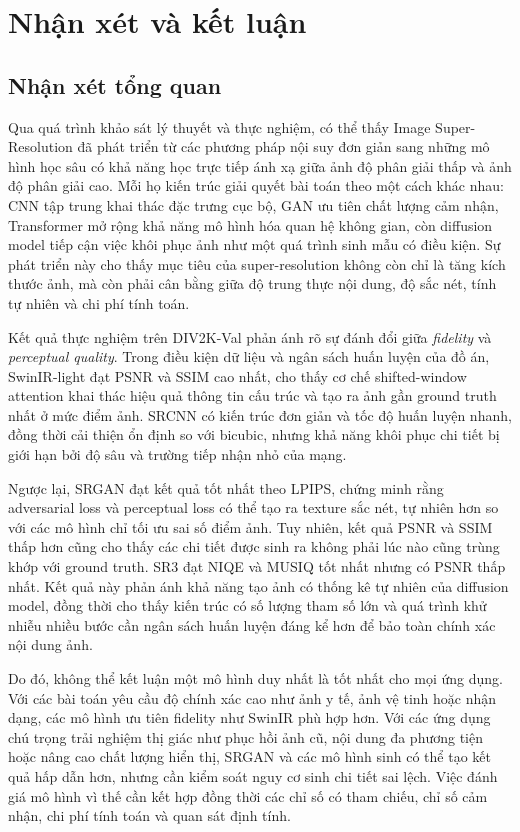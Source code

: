 \section{Nhận xét và kết luận}

\subsection{Nhận xét tổng quan}

Qua quá trình khảo sát lý thuyết và thực nghiệm, có thể thấy Image
Super-Resolution đã phát triển từ các phương pháp nội suy đơn giản sang những mô
hình học sâu có khả năng học trực tiếp ánh xạ giữa ảnh độ phân giải thấp và ảnh
độ phân giải cao. Mỗi họ kiến trúc giải quyết bài toán theo một cách khác nhau:
CNN tập trung khai thác đặc trưng cục bộ, GAN ưu tiên chất lượng cảm nhận,
Transformer mở rộng khả năng mô hình hóa quan hệ không gian, còn diffusion model
tiếp cận việc khôi phục ảnh như một quá trình sinh mẫu có điều kiện. Sự phát
triển này cho thấy mục tiêu của super-resolution không còn chỉ là tăng kích
thước ảnh, mà còn phải cân bằng giữa độ trung thực nội dung, độ sắc nét, tính tự
nhiên và chi phí tính toán.

Kết quả thực nghiệm trên DIV2K-Val phản ánh rõ sự đánh đổi giữa
\textit{fidelity} và \textit{perceptual quality}. Trong điều kiện dữ liệu và
ngân sách huấn luyện của đồ án, SwinIR-light đạt PSNR và SSIM cao nhất, cho thấy
cơ chế shifted-window attention khai thác hiệu quả thông tin cấu trúc và tạo ra
ảnh gần ground truth nhất ở mức điểm ảnh. SRCNN có kiến trúc đơn giản và tốc độ
huấn luyện nhanh, đồng thời cải thiện ổn định so với bicubic, nhưng khả năng khôi
phục chi tiết bị giới hạn bởi độ sâu và trường tiếp nhận nhỏ của mạng.

Ngược lại, SRGAN đạt kết quả tốt nhất theo LPIPS, chứng minh rằng
adversarial loss và perceptual loss có thể tạo ra texture sắc nét, tự nhiên hơn
so với các mô hình chỉ tối ưu sai số điểm ảnh. Tuy nhiên, kết quả PSNR và SSIM
thấp hơn cũng cho thấy các chi tiết được sinh ra không phải lúc nào cũng trùng
khớp với ground truth. SR3 đạt NIQE và MUSIQ tốt nhất nhưng có PSNR thấp nhất. Kết quả này
phản ánh khả năng tạo ảnh có thống kê tự nhiên của diffusion model, đồng thời
cho thấy kiến trúc có số lượng tham số lớn và quá trình khử nhiễu nhiều bước cần
ngân sách huấn luyện đáng kể hơn để bảo toàn chính xác nội dung ảnh.

Do đó, không thể kết luận một mô hình duy nhất là tốt nhất cho mọi ứng dụng. Với
các bài toán yêu cầu độ chính xác cao như ảnh y tế, ảnh vệ tinh hoặc nhận dạng,
các mô hình ưu tiên fidelity như SwinIR phù hợp hơn. Với các ứng dụng chú trọng
trải nghiệm thị giác như phục hồi ảnh cũ, nội dung đa phương tiện hoặc nâng cao
chất lượng hiển thị, SRGAN và các mô hình sinh có thể tạo kết quả hấp dẫn hơn,
nhưng cần kiểm soát nguy cơ sinh chi tiết sai lệch. Việc đánh giá mô hình vì thế
cần kết hợp đồng thời các chỉ số có tham chiếu, chỉ số cảm nhận, chi phí tính
toán và quan sát định tính.

